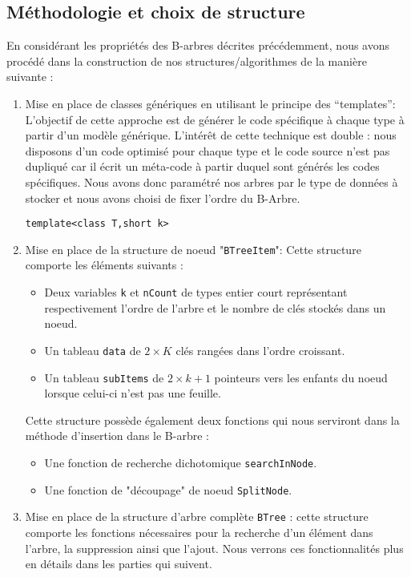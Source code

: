 \subsection{Méthodologie et choix de structure}
En considérant les propriétés des B-arbres décrites précédemment, nous avons procédé dans la construction de nos structures/algorithmes de la manière suivante : 
\begin{enumerate}
\item Mise en place de classes génériques en utilisant le principe des “templates”: L’objectif de cette approche est de générer le code spécifique à chaque type à partir d'un modèle générique. L’intérêt de cette technique est double : nous disposons d’un code optimisé pour chaque type et le code source n'est pas dupliqué car il écrit un méta-code à partir duquel sont générés les codes spécifiques. Nous avons donc paramétré nos arbres par le type de données à stocker et nous avons choisi de fixer l’ordre du B-Arbre.
\begin{lstlisting}
template<class T,short k>
\end{lstlisting}
\item     Mise en place de la structure de noeud "\verb+BTreeItem+": Cette structure comporte les éléments suivants :
\begin{itemize}
\item     Deux variables \verb+k+ et \verb+nCount+ de types entier court représentant respectivement l'ordre de l'arbre et le nombre de clés stockés dans un noeud.
\item     Un tableau \verb+data+ de $2 \times K$ clés rangées dans l'ordre croissant.
\item     Un tableau \verb+subItems+ de $2\times k+1$ pointeurs vers les enfants du noeud lorsque celui-ci n'est pas une feuille.
\end{itemize}
Cette structure possède également deux fonctions qui nous serviront dans la méthode d’insertion dans le B-arbre :
\begin{itemize}
\item     Une fonction de recherche dichotomique\cite{dichotomie} \verb+searchInNode+.
\item         Une fonction de "découpage" de noeud \verb+SplitNode+.   
\end{itemize}
\item     Mise en place de la structure d’arbre complète \verb+BTree+ : cette structure comporte les fonctions nécessaires pour la recherche d’un élément dans l’arbre, la suppression ainsi que l’ajout. Nous verrons ces fonctionnalités plus en détails dans les parties qui suivent.
\end{enumerate}

